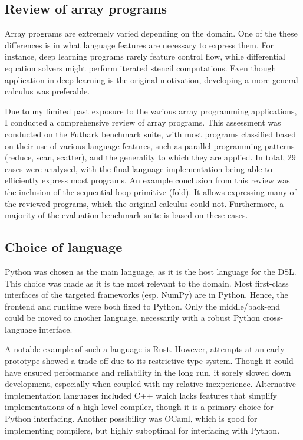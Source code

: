 \subsection{Review of array programs}

Array programs are extremely varied depending on the domain. One of the these differences is in what language features are necessary to express them. For instance, deep learning programs rarely feature control flow, while differential equation solvers might perform iterated stencil computations. Even though application in deep learning is the original motivation, developing a more general calculus was preferable.

Due to my limited past exposure to the various array programming applications, I conducted a comprehensive review of array programs. This assessment was conducted on the Futhark benchmark suite, with most programs classified based on their use of various language features, such as parallel programming patterns (reduce, scan, scatter), and the generality to which they are applied. In total, 29 cases were analysed, with the final language implementation being able to efficiently express most programs.
An example conclusion from this review was the inclusion of the sequential loop primitive (fold). It allows expressing many of the reviewed programs, which the original calculus could not. 
Furthermore, a majority of the evaluation benchmark suite is based on these cases. 

\subsection{Choice of language}

Python was chosen as the main language, as it is the host language for the DSL. This choice was made as it is the most relevant to the domain. Most first-class interfaces of the targeted frameworks (esp. NumPy) are in Python. Hence, the frontend and runtime were both fixed to Python. Only the middle/back-end could be moved to another language, necessarily with a robust Python cross-language interface. 

A notable example of such a language is Rust. However, attempts at an early prototype showed a trade-off due to its restrictive type system. Though it could have ensured performance and reliability in the long run, it sorely slowed down development, especially when coupled with my relative inexperience. Alternative implementation languages included C++ which lacks features that simplify implementations of a high-level compiler, though it is a primary choice for Python interfacing. Another possibility was OCaml, which is good for implementing compilers, but highly suboptimal for interfacing with Python. 

